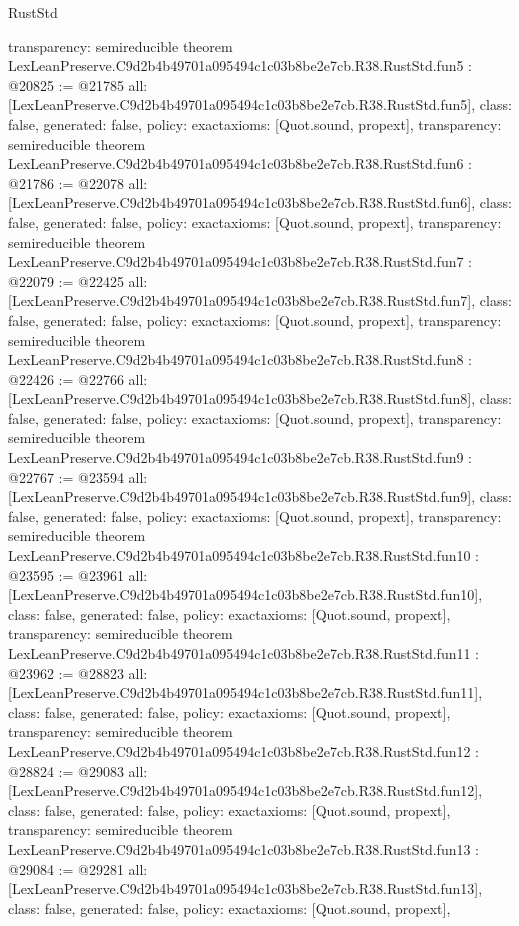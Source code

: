 \begin{lexlean}{RustStd}
\begin{coremodule}
{  transparency: semireducible
}
theorem LexLeanPreserve.C9d2b4b49701a095494c1c03b8be2e7cb.R38.RustStd.fun5 : @20825 := @21785 {
  all: [LexLeanPreserve.C9d2b4b49701a095494c1c03b8be2e7cb.R38.RustStd.fun5],
  class: false,
  generated: false,
  policy: exact{axioms: [Quot.sound, propext]},
  transparency: semireducible
}
theorem LexLeanPreserve.C9d2b4b49701a095494c1c03b8be2e7cb.R38.RustStd.fun6 : @21786 := @22078 {
  all: [LexLeanPreserve.C9d2b4b49701a095494c1c03b8be2e7cb.R38.RustStd.fun6],
  class: false,
  generated: false,
  policy: exact{axioms: [Quot.sound, propext]},
  transparency: semireducible
}
theorem LexLeanPreserve.C9d2b4b49701a095494c1c03b8be2e7cb.R38.RustStd.fun7 : @22079 := @22425 {
  all: [LexLeanPreserve.C9d2b4b49701a095494c1c03b8be2e7cb.R38.RustStd.fun7],
  class: false,
  generated: false,
  policy: exact{axioms: [Quot.sound, propext]},
  transparency: semireducible
}
theorem LexLeanPreserve.C9d2b4b49701a095494c1c03b8be2e7cb.R38.RustStd.fun8 : @22426 := @22766 {
  all: [LexLeanPreserve.C9d2b4b49701a095494c1c03b8be2e7cb.R38.RustStd.fun8],
  class: false,
  generated: false,
  policy: exact{axioms: [Quot.sound, propext]},
  transparency: semireducible
}
theorem LexLeanPreserve.C9d2b4b49701a095494c1c03b8be2e7cb.R38.RustStd.fun9 : @22767 := @23594 {
  all: [LexLeanPreserve.C9d2b4b49701a095494c1c03b8be2e7cb.R38.RustStd.fun9],
  class: false,
  generated: false,
  policy: exact{axioms: [Quot.sound, propext]},
  transparency: semireducible
}
theorem LexLeanPreserve.C9d2b4b49701a095494c1c03b8be2e7cb.R38.RustStd.fun10 : @23595 := @23961 {
  all: [LexLeanPreserve.C9d2b4b49701a095494c1c03b8be2e7cb.R38.RustStd.fun10],
  class: false,
  generated: false,
  policy: exact{axioms: [Quot.sound, propext]},
  transparency: semireducible
}
theorem LexLeanPreserve.C9d2b4b49701a095494c1c03b8be2e7cb.R38.RustStd.fun11 : @23962 := @28823 {
  all: [LexLeanPreserve.C9d2b4b49701a095494c1c03b8be2e7cb.R38.RustStd.fun11],
  class: false,
  generated: false,
  policy: exact{axioms: [Quot.sound, propext]},
  transparency: semireducible
}
theorem LexLeanPreserve.C9d2b4b49701a095494c1c03b8be2e7cb.R38.RustStd.fun12 : @28824 := @29083 {
  all: [LexLeanPreserve.C9d2b4b49701a095494c1c03b8be2e7cb.R38.RustStd.fun12],
  class: false,
  generated: false,
  policy: exact{axioms: [Quot.sound, propext]},
  transparency: semireducible
}
theorem LexLeanPreserve.C9d2b4b49701a095494c1c03b8be2e7cb.R38.RustStd.fun13 : @29084 := @29281 {
  all: [LexLeanPreserve.C9d2b4b49701a095494c1c03b8be2e7cb.R38.RustStd.fun13],
  class: false,
  generated: false,
  policy: exact{axioms: [Quot.sound, propext]},
}
\end{coremodule}
\end{lexlean}

